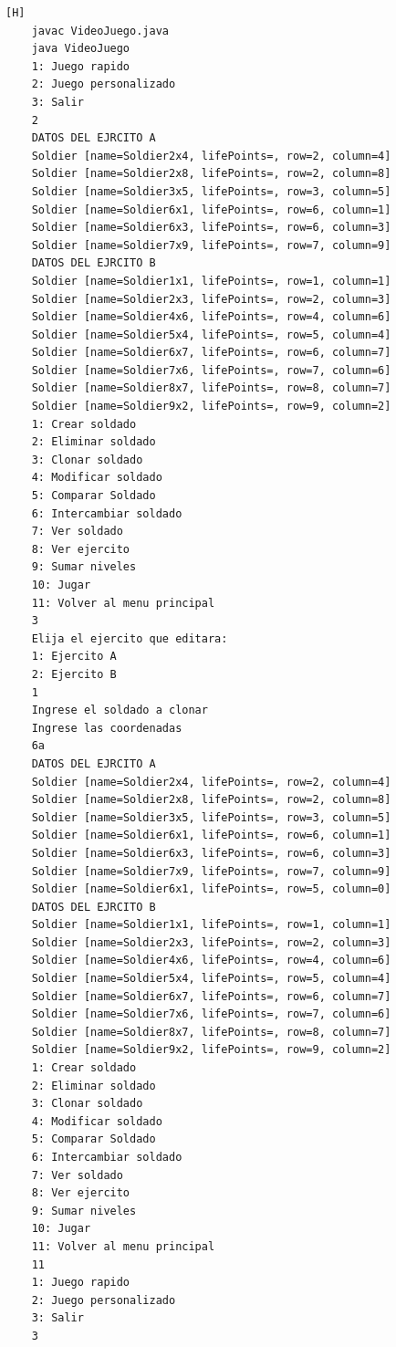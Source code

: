\documentclass{article}
\begin{document}
	
	\begin{lstlisting}[language=bash,caption={Compilando y probando el metodo cloneSoldier  }][H]
	javac VideoJuego.java
	java VideoJuego
	1: Juego rapido
	2: Juego personalizado
	3: Salir
	2
	DATOS DEL EJRCITO A
	Soldier [name=Soldier2x4, lifePoints=, row=2, column=4]
	Soldier [name=Soldier2x8, lifePoints=, row=2, column=8]
	Soldier [name=Soldier3x5, lifePoints=, row=3, column=5]
	Soldier [name=Soldier6x1, lifePoints=, row=6, column=1]
	Soldier [name=Soldier6x3, lifePoints=, row=6, column=3]
	Soldier [name=Soldier7x9, lifePoints=, row=7, column=9]
	DATOS DEL EJRCITO B
	Soldier [name=Soldier1x1, lifePoints=, row=1, column=1]
	Soldier [name=Soldier2x3, lifePoints=, row=2, column=3]
	Soldier [name=Soldier4x6, lifePoints=, row=4, column=6]
	Soldier [name=Soldier5x4, lifePoints=, row=5, column=4]
	Soldier [name=Soldier6x7, lifePoints=, row=6, column=7]
	Soldier [name=Soldier7x6, lifePoints=, row=7, column=6]
	Soldier [name=Soldier8x7, lifePoints=, row=8, column=7]
	Soldier [name=Soldier9x2, lifePoints=, row=9, column=2]
	1: Crear soldado
	2: Eliminar soldado
	3: Clonar soldado
	4: Modificar soldado
	5: Comparar Soldado
	6: Intercambiar soldado
	7: Ver soldado
	8: Ver ejercito
	9: Sumar niveles
	10: Jugar
	11: Volver al menu principal
	3
	Elija el ejercito que editara:
	1: Ejercito A
	2: Ejercito B
	1
	Ingrese el soldado a clonar
	Ingrese las coordenadas
	6a
	DATOS DEL EJRCITO A
	Soldier [name=Soldier2x4, lifePoints=, row=2, column=4]
	Soldier [name=Soldier2x8, lifePoints=, row=2, column=8]
	Soldier [name=Soldier3x5, lifePoints=, row=3, column=5]
	Soldier [name=Soldier6x1, lifePoints=, row=6, column=1]
	Soldier [name=Soldier6x3, lifePoints=, row=6, column=3]
	Soldier [name=Soldier7x9, lifePoints=, row=7, column=9]
	Soldier [name=Soldier6x1, lifePoints=, row=5, column=0]
	DATOS DEL EJRCITO B
	Soldier [name=Soldier1x1, lifePoints=, row=1, column=1]
	Soldier [name=Soldier2x3, lifePoints=, row=2, column=3]
	Soldier [name=Soldier4x6, lifePoints=, row=4, column=6]
	Soldier [name=Soldier5x4, lifePoints=, row=5, column=4]
	Soldier [name=Soldier6x7, lifePoints=, row=6, column=7]
	Soldier [name=Soldier7x6, lifePoints=, row=7, column=6]
	Soldier [name=Soldier8x7, lifePoints=, row=8, column=7]
	Soldier [name=Soldier9x2, lifePoints=, row=9, column=2]
	1: Crear soldado
	2: Eliminar soldado
	3: Clonar soldado
	4: Modificar soldado
	5: Comparar Soldado
	6: Intercambiar soldado
	7: Ver soldado
	8: Ver ejercito
	9: Sumar niveles
	10: Jugar
	11: Volver al menu principal
	11
	1: Juego rapido
	2: Juego personalizado
	3: Salir
	3
	\end{lstlisting}
	
\end{document}
